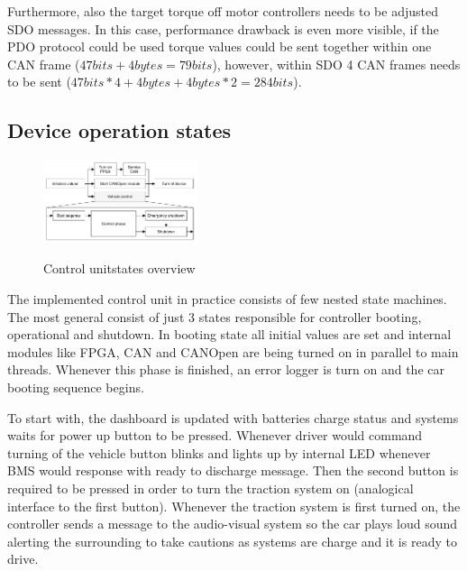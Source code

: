 Furthermore, also the target torque off motor controllers needs to be adjusted SDO messages. In this case, performance drawback is even more visible, if the PDO protocol could be used torque values could be sent together within one CAN frame ($47bits+4bytes=79 bits$), however, within SDO 4 CAN frames needs to be sent ($47bits*4+4bytes+4bytes*2=284bits$).

\subsection{Device operation states}

\begin{figure}
    \vspace{-20pt}
    \centering
        \includegraphics[width=0.4\textwidth]{figures/System_overview}
        \label{fig:sys_over}
        \caption{Control unit\newline states overview}
    \vspace{-20pt}
\end{figure}

The implemented control unit in practice consists of few nested state machines. The most general consist of just 3 states responsible for controller booting, operational and shutdown.
In booting state all initial values are set and internal modules like FPGA, CAN and CANOpen are being turned on in parallel to main threads. Whenever this phase is finished, an error logger is turn on and the car booting sequence begins.

To start with, the dashboard is updated with batteries charge status and systems waits for power up button to be pressed. Whenever driver would command turning of the vehicle button blinks and lights up by internal LED whenever BMS would response with ready to discharge message. Then the second button is required to be pressed in order to turn the traction system on (analogical interface to the first button). Whenever the traction system is first turned on, the controller sends a message to the audio-visual system so the car plays loud sound alerting the surrounding to take cautions as systems are charge and it is ready to drive.

